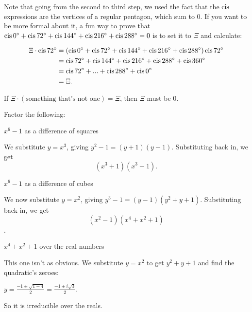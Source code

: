 \documentclass[../key.tex]{subfiles}
\begin{document}
Note that going from the second to third step, we used the fact that the $\operatorname{cis}$ expressions are the vertices of a regular pentagon, which sum to $0$. If you want to be more formal about it, a fun way to prove that $\operatorname{cis} 0^\circ + \operatorname{cis} 72^\circ + \operatorname{cis} 144^\circ + \operatorname{cis} 216^\circ + \operatorname{cis} 288^\circ=0$ is to set it to $\Xi$ and calculate:

\begin{align*}
    \Xi\cdot \operatorname{cis} 72^\circ &= (\operatorname{cis} 0^\circ + \operatorname{cis} 72^\circ + \operatorname{cis} 144^\circ + \operatorname{cis} 216^\circ + \operatorname{cis} 288^\circ) \operatorname{cis} 72^\circ \\
    &= \operatorname{cis} 72^\circ + \operatorname{cis} 144^\circ + \operatorname{cis} 216^\circ + \operatorname{cis} 288^\circ + \operatorname{cis} 360^\circ \\
    &= \operatorname{cis} 72^\circ + ... + \operatorname{cis} 288^\circ + \operatorname{cis} 0^\circ \\
    &= \Xi.
\end{align*}

If $\Xi\cdot (\text{something that's not one})=\Xi$, then $\Xi$ must be $0$.

\begin{outer_problem}
\item Factor the following:
\end{outer_problem}

\begin{inner_problem}[start=1]
\item $x^6-1$ as a difference of squares
\end{inner_problem}

We substitute $y=x^3$, giving $y^2-1=(y+1)(y-1)$. Substituting back in, we get $$(x^3+1)(x^3-1).$$

\begin{inner_problem}
\item $x^6-1$ as a difference of cubes
\end{inner_problem}

We now substitute $y=x^2$, giving $y^3-1 = (y-1)(y^2+y+1)$. Substituting back in, we get $$(x^2-1)(x^4+x^2+1)$$.

\begin{inner_problem}
\item $x^4+x^2+1$ over the real numbers
\end{inner_problem}

This one isn't as obvious. We substitute $y=x^2$ to get $y^2+y+1$ and find the quadratic's zeroes:

$y=\frac{-1\pm \sqrt{1 - 4}}{2} = \frac{-1\pm i\sqrt{3}}{2}.$

So it is irreducible over the reals.
\end{document}
